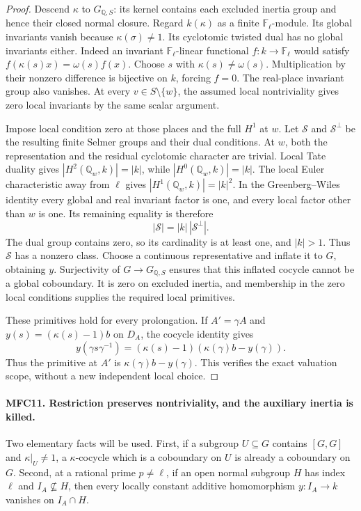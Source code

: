 \begin{proof}
Descend \(\kappa\) to \(G_{\mathbb Q,S}\): its kernel
contains each excluded inertia group and hence their closed
normal closure.  Regard \(k(\kappa)\) as a finite
\(\mathbb F_\ell\)-module.  Its global invariants vanish
because \(\kappa(\sigma)\ne1\).  Its cyclotomic twisted
dual has no global invariants either.  Indeed an invariant
\(\mathbb F_\ell\)-linear functional \(f:k\to\mathbb F_\ell\)
would satisfy \(f(\kappa(s)x)=\omega(s)f(x)\).
Choose \(s\) with \(\kappa(s)\ne\omega(s)\).  Multiplication
by their nonzero difference is bijective on \(k\), forcing
\(f=0\).  The real-place invariant group also vanishes.
At every \(v\in S\setminus\{w\}\), the assumed local
nontriviality gives zero local invariants by the same scalar
argument.

Impose local condition zero at those places and the full
\(H^1\) at \(w\).  Let \(\mathcal S\) and
\(\mathcal S^\perp\) be the resulting finite Selmer groups
and their dual conditions.  At \(w\), both the representation
and the residual cyclotomic character are trivial.  Local Tate
duality gives \(|H^2(\mathbb Q_w,k)|=|k|\), while
\(|H^0(\mathbb Q_w,k)|=|k|\).  The local Euler characteristic
away from \(\ell\) gives
\(|H^1(\mathbb Q_w,k)|=|k|^2\).
In the Greenberg--Wiles identity every global and real invariant
factor is one, and every local factor other than \(w\) is
one.  Its remaining equality is therefore
\[
                      |\mathcal S|=|k|\,|\mathcal S^\perp|.
                                                               \tag{MFC.25}
\]
The dual group contains zero, so its cardinality is at least
one, and \(|k|>1\).  Thus \(\mathcal S\) has a nonzero
class.  Choose a continuous representative and inflate it to
\(G\), obtaining \(y\).  Surjectivity of
\(G\to G_{\mathbb Q,S}\) ensures that this inflated cocycle
cannot be a global coboundary.  It is zero on excluded inertia,
and membership in the zero local conditions supplies the required
local primitives.

These primitives hold for every prolongation.  If
\(A'=\gamma A\) and \(y(s)=(\kappa(s)-1)b\) on \(D_A\),
the cocycle identity gives
\[
 y(\gamma s\gamma^{-1})
       =(\kappa(s)-1)(\kappa(\gamma)b-y(\gamma)).
\]
Thus the primitive at \(A'\) is
\(\kappa(\gamma)b-y(\gamma)\).  This verifies the exact
valuation scope, without a new independent local choice.
\end{proof}

\paragraph{MFC11. Restriction preserves nontriviality, and the auxiliary inertia is killed.}
\label{claim:MFC11}
Two elementary facts will be used.  First, if a subgroup
\(U\subseteq G\) contains \([G,G]\) and
\(\kappa|_U\ne1\), a \(\kappa\)-cocycle which is a
coboundary on \(U\) is already a coboundary on \(G\).
Second, at a rational prime \(p\ne\ell\), if an open
normal subgroup \(H\) has index \(\ell\) and
\(I_A\not\subseteq H\), then every locally constant additive
homomorphism \(y:I_A\to k\) vanishes on \(I_A\cap H\).

